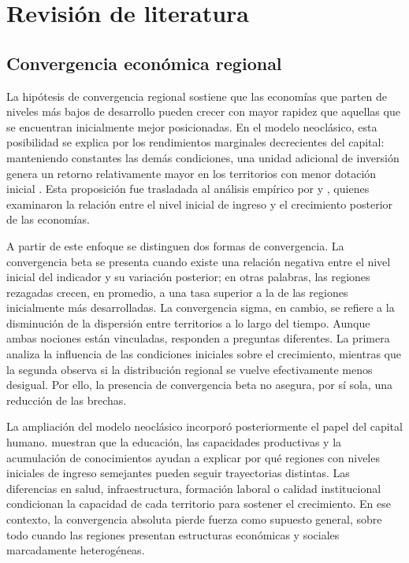 \section{Revisión de literatura}

\subsection{Convergencia económica regional}

La hipótesis de convergencia regional sostiene que las economías que parten de
niveles más bajos de desarrollo pueden crecer con mayor rapidez que aquellas
que se encuentran inicialmente mejor posicionadas. En el modelo neoclásico,
esta posibilidad se explica por los rendimientos marginales decrecientes del
capital: manteniendo constantes las demás condiciones, una unidad adicional de
inversión genera un retorno relativamente mayor en los territorios con menor
dotación inicial \parencite{solow1956}. Esta proposición fue trasladada al
análisis empírico por \textcite{barro_sala1991} y
\textcite{barro_sala1992}, quienes examinaron la relación entre el nivel
inicial de ingreso y el crecimiento posterior de las economías.

A partir de este enfoque se distinguen dos formas de convergencia. La
convergencia beta se presenta cuando existe una relación negativa entre el
nivel inicial del indicador y su variación posterior; en otras palabras, las
regiones rezagadas crecen, en promedio, a una tasa superior a la de las
regiones inicialmente más desarrolladas. La convergencia sigma, en cambio, se
refiere a la disminución de la dispersión entre territorios a lo largo del
tiempo. Aunque ambas nociones están vinculadas, responden a preguntas
diferentes. La primera analiza la influencia de las condiciones iniciales sobre
el crecimiento, mientras que la segunda observa si la distribución regional se
vuelve efectivamente menos desigual. Por ello, la presencia de convergencia
beta no asegura, por sí sola, una reducción de las brechas.

La ampliación del modelo neoclásico incorporó posteriormente el papel del
capital humano. \textcite{mankiw1992} muestran que la educación, las
capacidades productivas y la acumulación de conocimientos ayudan a explicar por
qué regiones con niveles iniciales de ingreso semejantes pueden seguir
trayectorias distintas. Las diferencias en salud, infraestructura, formación
laboral o calidad institucional condicionan la capacidad de cada territorio
para sostener el crecimiento. En ese contexto, la convergencia absoluta pierde
fuerza como supuesto general, sobre todo cuando las regiones presentan
estructuras económicas y sociales marcadamente heterogéneas.

